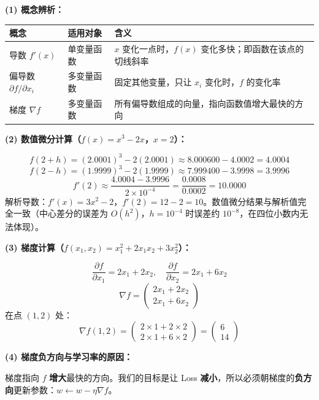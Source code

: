 \documentclass[a4paper,11pt]{ctexart}
\begin{document}
\begin{solutionbox}[参考答案与详细解析]
    \textbf{(1) 概念辨析：}

    \begin{center}
    \begin{tabular}{p{2.2cm} p{4.0cm} p{4.3cm}}
        \toprule
        概念 & 适用对象 & 含义 \\
        \midrule
        导数 $f'(x)$ & 单变量函数 & $x$ 变化一点时，$f(x)$ 变化多快；即函数在该点的切线斜率 \\[0.8em]
        偏导数 $\partial f/\partial x_i$ & 多变量函数 & 固定其他变量，只让 $x_i$ 变化时，$f$ 的变化率 \\[0.8em]
        梯度 $\nabla f$ & 多变量函数 & 所有偏导数组成的向量，指向函数值增大最快的方向 \\
        \bottomrule
    \end{tabular}
    \end{center}

    \textbf{(2) 数值微分计算（$f(x)=x^3-2x$，$x=2$）：}

    \[
    f(2+h) = (2.0001)^3 - 2(2.0001) \approx 8.000600 - 4.0002 = 4.0004
    \]
    \[
    f(2-h) = (1.9999)^3 - 2(1.9999) \approx 7.999400 - 3.9998 = 3.9996
    \]
    \[
    f'(2) \approx \frac{4.0004 - 3.9996}{2 \times 10^{-4}} = \frac{0.0008}{0.0002} = \boxed{10.0000}
    \]
    解析导数：$f'(x) = 3x^2 - 2$，$f'(2) = 12 - 2 = 10$。数值微分结果与解析值完全一致（中心差分的误差为 $O(h^2)$，$h=10^{-4}$ 时误差约 $10^{-8}$，在四位小数内无法体现）。

    \textbf{(3) 梯度计算（$f(x_1,x_2) = x_1^2 + 2x_1x_2 + 3x_2^2$）：}

    \[
    \frac{\partial f}{\partial x_1} = 2x_1 + 2x_2, \quad \frac{\partial f}{\partial x_2} = 2x_1 + 6x_2
    \]
    \[
    \nabla f = \begin{pmatrix} 2x_1+2x_2 \\ 2x_1+6x_2 \end{pmatrix}
    \]
    在点 $(1, 2)$ 处：
    \[
    \nabla f(1,2) = \begin{pmatrix} 2\times1+2\times2 \\ 2\times1+6\times2 \end{pmatrix} = \boxed{\begin{pmatrix} 6 \\ 14 \end{pmatrix}}
    \]

    \textbf{(4) 梯度负方向与学习率的原因：}

    梯度指向 $f$ \textbf{增大}最快的方向。我们的目标是让 Loss \textbf{减小}，所以必须朝梯度的\textbf{负方向}更新参数：$w \leftarrow w - \eta \nabla f$。


\end{solutionbox}
\end{document}
